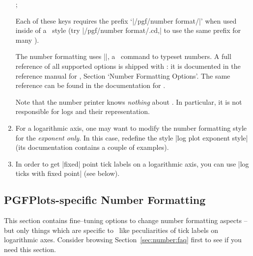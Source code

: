 \begin{enumerate}
\begin{codeexample}[]
; 
\end{codeexample}

\begin{codeexample}[]
\end{codeexample}

\begin{codeexample}[]
\end{codeexample}

\begin{codeexample}[]
\end{codeexample}

	\noindent Each of these keys requires the prefix `|/pgf/number format/|' when used inside of a \PGFPlots\ style (try |/pgf/number format/.cd,| to use the same prefix for many ).

	The number formatting uses |\pgfmathprintnumber|, a \pgfname\ command to typeset numbers. A full reference of all supported options is shipped with \PGFPlots: it is documented in the reference manual for \PGFPlotstable, Section `Number Formatting Options'. The same reference can be found in the documentation for \pgfname.

	Note that the number printer knows \emph{nothing} about \PGFPlots. In particular, it is not responsible for logs and their representation.

	\item For a logarithmic axis, one may want to modify the number formatting style for the \emph{exponent only}. In this case, redefine the style |log plot exponent style| (its documentation contains a couple of examples).

	\item In order to get |fixed| point tick labels on a logarithmic axis, you can use |log ticks with fixed point| (see below).
\end{enumerate}


\subsection{PGFPlots-specific Number Formatting}
This section contains fine--tuning options to change number formatting aspects -- but only things which are specific to \PGFPlots\ like peculiarities of tick labels on logarithmic axes. Consider browsing Section~\ref{sec:number:faq} first to see if you need this section. 

